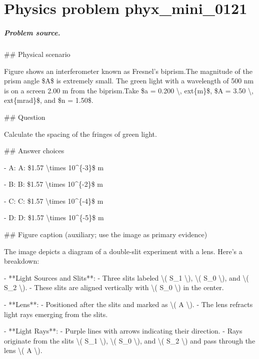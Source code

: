 
\chapter{Physics problem phyx\_mini\_0121}
\label{ch:PhyXMiniProblems_problem_phyx_mini_0121}

\paragraph{Problem source.}
\#\# Physical scenario

Figure shows an interferometer known as Fresnel’s biprism.The magnitude of the prism angle \$A\$ is extremely small. The green light with a wavelength of 500 nm is on a screen 2.00 m from the biprism.Take \$a = 0.200 \textbackslash{}, 	ext\{m\}\$, \$A = 3.50 \textbackslash{}, 	ext\{mrad\}\$, and \$n = 1.50\$.

\#\# Question

Calculate the spacing of the fringes of green light.

\#\# Answer choices

- A: A: \$1.57 \textbackslash{}times 10\textasciicircum{}\{-3\}\$ m

- B: B: \$1.57 \textbackslash{}times 10\textasciicircum{}\{-2\}\$ m

- C: C: \$1.57 \textbackslash{}times 10\textasciicircum{}\{-4\}\$ m

- D: D: \$1.57 \textbackslash{}times 10\textasciicircum{}\{-5\}\$ m

\#\# Figure caption (auxiliary; use the image as primary evidence)

The image depicts a diagram of a double-slit experiment with a lens. Here's a breakdown:

- **Light Sources and Slits**:
  - Three slits labeled \textbackslash{}( S\_1 \textbackslash{}), \textbackslash{}( S\_0 \textbackslash{}), and \textbackslash{}( S\_2 \textbackslash{}). 
  - These slits are aligned vertically with \textbackslash{}( S\_0 \textbackslash{}) in the center.

- **Lens**:
  - Positioned after the slits and marked as \textbackslash{}( A \textbackslash{}).
  - The lens refracts light rays emerging from the slits.

- **Light Rays**:
  - Purple lines with arrows indicating their direction.
  - Rays originate from the slits \textbackslash{}( S\_1 \textbackslash{}), \textbackslash{}( S\_0 \textbackslash{}), and \textbackslash{}( S\_2 \textbackslash{}) and pass through the lens \textbackslash{}( A \textbackslash{}).

